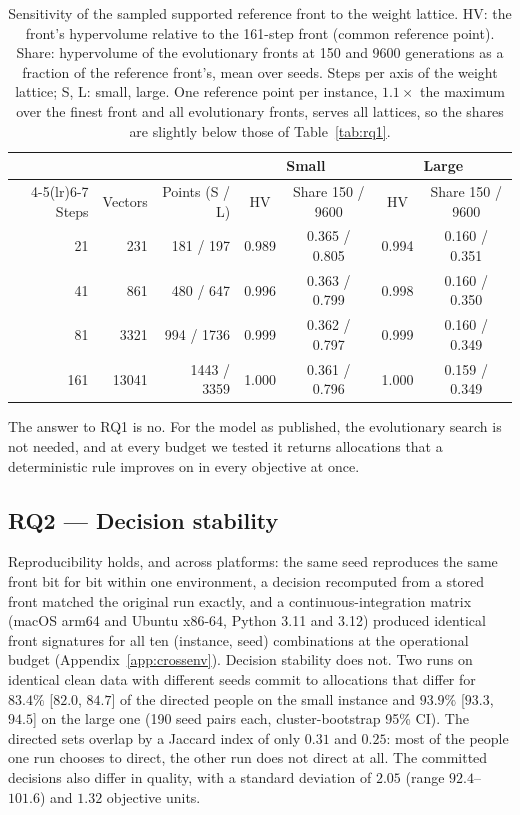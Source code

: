 \documentclass[systems,article,submit,moreauthors,pdftex]{Definitions/mdpi}
\begin{document}
\begin{table}[H]
\centering
\caption{Sensitivity of the sampled supported reference front to the weight lattice. HV: the
front's hypervolume relative to the 161-step front (common reference point). Share: hypervolume
of the evolutionary fronts at 150 and 9600 generations as a fraction of the reference front's,
mean over seeds. Steps per axis of the weight lattice; S, L: small, large. One reference point per
instance, $1.1\times$ the maximum over the finest front and all evolutionary fronts, serves all
lattices, so the shares are slightly below those of Table~\ref{tab:rq1}.\label{tab:grid}}
\footnotesize
\begin{tabular}{rrrcccc}
\toprule
& & & \multicolumn{2}{c}{Small} & \multicolumn{2}{c}{Large}\\
\cmidrule(lr){4-5}\cmidrule(lr){6-7}
Steps & Vectors & Points (S / L) & HV & Share 150 / 9600 & HV & Share 150 / 9600\\
\midrule
21 & 231 & 181 / 197 & 0.989 & 0.365 / 0.805 & 0.994 & 0.160 / 0.351\\
41 & 861 & 480 / 647 & 0.996 & 0.363 / 0.799 & 0.998 & 0.160 / 0.350\\
81 & 3321 & 994 / 1736 & 0.999 & 0.362 / 0.797 & 0.999 & 0.160 / 0.349\\
161 & 13041 & 1443 / 3359 & 1.000 & 0.361 / 0.796 & 1.000 & 0.159 / 0.349\\
\bottomrule
\end{tabular}
\end{table}

The answer to RQ1 is no. For the model as published, the evolutionary search is not needed,
and at every budget we tested it returns allocations that a deterministic rule improves on
in every objective at once.

\subsection{RQ2 --- Decision stability}\label{sec:rq2}
Reproducibility holds, and across platforms: the same seed reproduces the same front bit
for bit within one environment, a decision recomputed from a stored front matched the
original run exactly, and a continuous-integration matrix (macOS arm64 and Ubuntu x86-64,
Python 3.11 and 3.12) produced identical front signatures for all ten (instance, seed)
combinations at the operational budget (Appendix~\ref{app:crossenv}). Decision stability does not.
Two runs on identical clean data with different seeds commit to allocations that differ for
$83.4\%$ [$82.0$, $84.7$] of the directed people on the small instance and $93.9\%$ [$93.3$,
$94.5$] on the large one (190 seed pairs each, cluster-bootstrap 95\% CI). The directed sets
overlap by a Jaccard index of only $0.31$ and $0.25$: most of the people one run chooses to
direct, the other run does not direct at all. The committed decisions also differ in quality,
with a standard deviation of $2.05$ (range $92.4$--$101.6$) and $1.32$ objective units.
\end{document}
